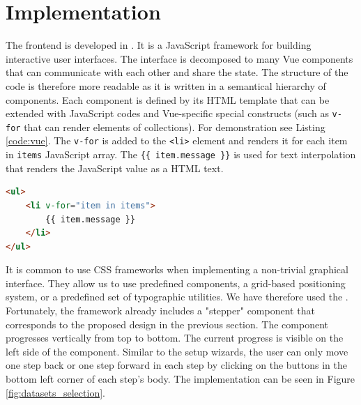 \section{Implementation}
The frontend is developed in . It is a JavaScript framework for
building interactive user interfaces. The interface is decomposed to many Vue
components that can communicate with each other and share the state. The
structure of the code is therefore more readable as it is written in a
semantical hierarchy of components. Each component is defined by its HTML
template that can be extended with JavaScript codes and Vue-specific special
constructs (such as \texttt{v-for} that can render elements of collections). For
demonstration see Listing \ref{code:vue}. The \texttt{v-for} is added to the
\texttt{<li>} element and renders it for each item in \texttt{items} JavaScript
array. The \texttt{\{\{ item.message \}\}} is used for text interpolation that
renders the JavaScript value as a HTML text.

\begin{lstlisting}[language=HTML, caption=Vue.js template example]
<ul>
    <li v-for="item in items">
        {{ item.message }}
    </li>
</ul>
\end{lstlisting}
\label{code:vue}

It is common to use CSS frameworks when implementing a non-trivial graphical
interface. They allow us to use predefined components, a grid-based positioning
system, or a predefined set of typographic utilities. We have therefore used the
. Fortunately, the framework already
includes a "stepper" component that corresponds to the proposed design in the
previous section. The component progresses vertically from top to bottom. The
current progress is visible on the left side of the component. Similar to the
setup wizards, the user can only move one step back or one step forward in each
step by clicking on the buttons in the bottom left corner of each step's body.
The implementation can be seen in Figure \ref{fig:datasets_selection}.

